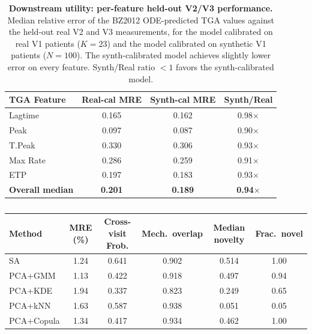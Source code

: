 \begin{table}[ht]
\centering
\caption{\textbf{Downstream utility: per-feature held-out V2/V3 performance.}
Median relative error of the BZ2012 ODE-predicted TGA values against the held-out
real V2 and V3 measurements, for the model calibrated on real V1 patients
($K{=}23$) and the model calibrated on synthetic V1 patients ($N{=}100$). The
synth-calibrated model achieves slightly lower error on every feature. Synth/Real
ratio $< 1$ favors the synth-calibrated model.}
\label{stab:downstream-utility}
\begin{tabular}{lccc}
\toprule
TGA Feature & Real-cal MRE & Synth-cal MRE & Synth/Real \\
\midrule
Lagtime           & 0.165 & 0.162 & 0.98$\times$ \\
Peak              & 0.097 & 0.087 & 0.90$\times$ \\
T.Peak            & 0.330 & 0.306 & 0.93$\times$ \\
Max Rate          & 0.286 & 0.259 & 0.91$\times$ \\
ETP               & 0.197 & 0.183 & 0.93$\times$ \\
\midrule
\textbf{Overall median} & \textbf{0.201} & \textbf{0.189} & \textbf{0.94$\times$} \\
\bottomrule
\end{tabular}
\end{table}

\begin{table}[ht]
\centering
\caption{}
\label{stab:pca-ablation}
\begin{tabular}{lccccc}
\toprule
Method & MRE (\%) & Cross-visit Frob. & Mech.\ overlap & Median novelty & Frac.\ novel \\
\midrule
SA         & 1.24 & 0.641 & 0.902 & 0.514 & 1.00 \\
PCA+GMM    & 1.13 & 0.422 & 0.918 & 0.497 & 0.94 \\
PCA+KDE    & 1.94 & 0.337 & 0.823 & 0.249 & 0.65 \\
PCA+kNN    & 1.63 & 0.587 & 0.938 & 0.051 & 0.05 \\
PCA+Copula & 1.34 & 0.417 & 0.934 & 0.462 & 1.00 \\
\bottomrule
\end{tabular}
\end{table}

